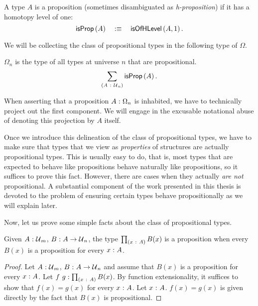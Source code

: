 \begin{defn}[Proposition]
  A type $A$ is a proposition (sometimes disambiguated as \emph{h-proposition}) if it has
  a homotopy level of one:
  \begin{equation*}
    \mathsf{isProp}\left(A\right) \quad:\equiv\quad \mathsf{isOfHLevel}\left(A, 1\right).
  \end{equation*}
\end{defn}

We will be collecting the class of propositional types in the following type of $\Omega$.

\begin{defn}[$\Omega$]
  $\Omega_n$ is the type of all types at universe $n$ that are propositional.
  \begin{equation*}
    \sum_{(A~:~\mathcal{U}{}_n)} \mathsf{isProp}\left(A\right).
  \end{equation*}
\end{defn}

When asserting that a proposition $A\hspace{0.1mm}:\hspace{0.1mm}\Omega_n$ is inhabited, we have to technically
project out the first component. We will engage in the excusable notational abuse of
denoting this projection by $A$ itself.

Once we introduce this delineation of the class of propositional types, we have to make
sure that types that we view as \emph{properties} of structures are actually propositional
types. This is usually easy to do, that is, most types that are expected to behave like
propositions behave naturally like propositions, so it suffices to prove this fact.
However, there are cases when they actually \emph{are not} propositional. A substantial
component of the work presented in this thesis is devoted to the problem of ensuring
certain types behave propositionally as we will explain later.

Now, let us prove some simple facts about the class of propositional types.

\begin{prop}\label{thm:pi-prop}
  Given $A\hspace{0.1mm}:\hspace{0.1mm}\mathcal{U}{}_m$, $B\hspace{0.1mm}:\hspace{0.1mm}A \rightarrow \mathcal{U}{}_n$, the type $\prod_{(x~:~A)} B(x)$
  is a proposition when every $B(x)$ is a proposition for every $x\hspace{0.1mm}:\hspace{0.1mm}A$.
\end{prop}
\begin{proof}
  Let $A\hspace{0.1mm}:\hspace{0.1mm}\mathcal{U}{}_m$, $B\hspace{0.1mm}:\hspace{0.1mm}A \rightarrow \mathcal{U}{}_n$ and assume that $B(x)$ is a
  proposition for every $x\hspace{0.1mm}:\hspace{0.1mm}A$. Let $f~g:\prod_{(x~:~A)} B(x)$. By
  function extensionality, it suffices to show that $f(x) = g(x)$ for every
  $x\hspace{0.1mm}:\hspace{0.1mm}A$. Let $x\hspace{0.1mm}:\hspace{0.1mm}A$. $f(x) = g(x)$ is given directly by the fact that
  $B(x)$ is propositional.
\end{proof}


